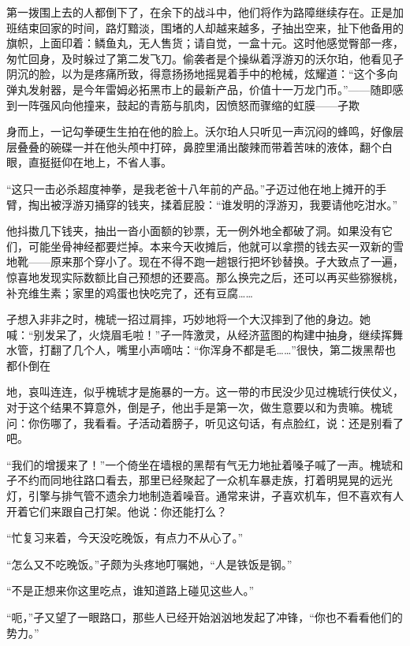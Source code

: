 \documentclass{article}
\begin{document}
第一拨围上去的人都倒下了，在余下的战斗中，他们将作为路障继续存在。正是加班结束回家的时间，路灯黯淡，围堵的人却越来越多，孑抽出空来，扯下他备用的旗帜，上面印着：鳞鱼丸，无人售货；请自觉，一盒十元。这时他感觉臀部一疼，匆忙回身，及时躲过了第二发飞刀。偷袭者是个操纵着浮游刃的沃尔珀，他看见孑阴沉的脸，以为是疼痛所致，得意扬扬地摇晃着手中的枪械，炫耀道：“这个多向弹丸发射器，是今年雷姆必拓黑市上的最新产品，价值十一万龙门币。”——随即感到一阵强风向他撞来，鼓起的青筋与肌肉，因愤怒而骤缩的虹膜——孑欺

\newpage 

身而上，一记勾拳硬生生拍在他的脸上。沃尔珀人只听见一声沉闷的蜂鸣，好像层层叠叠的碗碟一并在他头颅中打碎，鼻腔里涌出酸辣而带着苦味的液体，翻个白眼，直挺挺仰在地上，不省人事。

“这只一击必杀超度神拳，是我老爸十八年前的产品。”孑迈过他在地上摊开的手臂，掏出被浮游刃捅穿的钱夹，揉着屁股：“谁发明的浮游刃，我要请他吃泔水。”

他抖擞几下钱夹，抽出一沓小面额的钞票，无一例外地全都破了洞。如果没有它们，可能坐骨神经都要烂掉。本来今天收摊后，他就可以拿攒的钱去买一双新的雪地靴——原来那个穿小了。现在不得不跑一趟银行把坏钞替换。孑大致点了一遍，惊喜地发现实际数额比自己预想的还要高。那么换完之后，还可以再买些猕猴桃，补充维生素；家里的鸡蛋也快吃完了，还有豆腐……

孑想入非非之时，槐琥一招过肩摔，巧妙地将一个大汉摔到了他的身边。她喊：“别发呆了，火烧眉毛啦！”孑一阵激灵，从经济蓝图的构建中抽身，继续挥舞水管，打翻了几个人，嘴里小声嘀咕：“你浑身不都是毛……”很快，第二拨黑帮也都仆倒在

\newpage 

地，哀叫连连，似乎槐琥才是施暴的一方。这一带的市民没少见过槐琥行侠仗义，对于这个结果不算意外，倒是孑，他出手是第一次，做生意要以和为贵嘛。槐琥问：你伤哪了，我看看。孑活动着膀子，听见这句话，有点脸红，说：还是别看了吧。

“我们的增援来了！”一个倚坐在墙根的黑帮有气无力地扯着嗓子喊了一声。槐琥和孑不约而同地往路口看去，那里已经聚起了一众机车暴走族，打着明晃晃的远光灯，引擎与排气管不遗余力地制造着噪音。通常来讲，孑喜欢机车，但不喜欢有人开着它们来跟自己打架。他说：你还能打么？

“忙复习来着，今天没吃晚饭，有点力不从心了。”

“怎么又不吃晚饭。”孑颇为头疼地叮嘱她，“人是铁饭是钢。”

“不是正想来你这里吃点，谁知道路上碰见这些人。”

“呃，”孑又望了一眼路口，那些人已经开始汹汹地发起了冲锋，“你也不看看他们的势力。”
\end{document}
